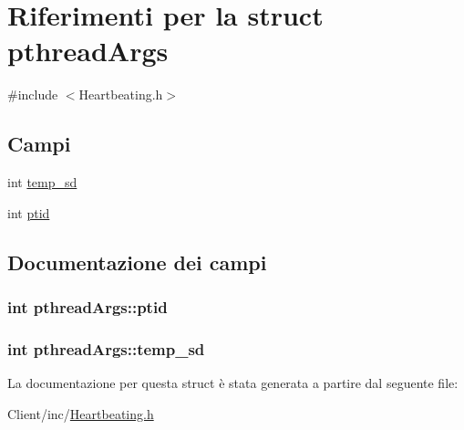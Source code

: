 \hypertarget{structpthreadArgs}{}\section{Riferimenti per la struct pthread\+Args}
\label{structpthreadArgs}


{\ttfamily \#include $<$Heartbeating.\+h$>$}

\subsection*{Campi}
\begin{DoxyCompactItemize}
\item 
int \hyperlink{structpthreadArgs_a028f49dcb3a6ed77870caacec6f2b968}{temp\+\_\+sd}
\item 
int \hyperlink{structpthreadArgs_abc763a99a614f8e00c11fbbece336516}{ptid}
\end{DoxyCompactItemize}


\subsection{Documentazione dei campi}
\subsubsection[{\texorpdfstring{ptid}{ptid}}]{\setlength{\rightskip}{0pt plus 5cm}int pthread\+Args\+::ptid}\hypertarget{structpthreadArgs_abc763a99a614f8e00c11fbbece336516}{}\label{structpthreadArgs_abc763a99a614f8e00c11fbbece336516}
\subsubsection[{\texorpdfstring{temp\+\_\+sd}{temp_sd}}]{\setlength{\rightskip}{0pt plus 5cm}int pthread\+Args\+::temp\+\_\+sd}\hypertarget{structpthreadArgs_a028f49dcb3a6ed77870caacec6f2b968}{}\label{structpthreadArgs_a028f49dcb3a6ed77870caacec6f2b968}


La documentazione per questa struct è stata generata a partire dal seguente file\+:\begin{DoxyCompactItemize}
\item 
Client/inc/\hyperlink{Client_2inc_2Heartbeating_8h}{Heartbeating.\+h}\end{DoxyCompactItemize}
